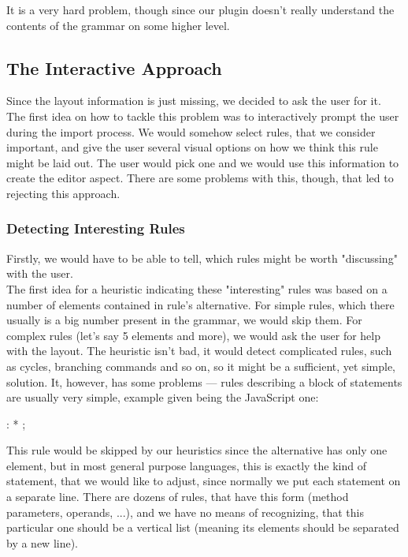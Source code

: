 It is a very hard problem, though since our plugin doesn't really understand the contents of the grammar on some higher level.

\subsection{The Interactive Approach}

Since the layout information is just missing, we decided to ask the user for it.
The first idea on how to tackle this problem was to interactively prompt the user during the import process.
We would somehow select rules, that we consider important, and give the user several visual options on how we think this rule might be laid out.
The user would pick one and we would use this information to create the editor aspect.
There are some problems with this, though, that led to rejecting this approach.

\subsubsection{Detecting Interesting Rules}

Firstly, we would have to be able to tell, which rules might be worth "discussing" with the user.
\\

The first idea for a heuristic indicating these "interesting" rules was based on a number of elements contained in rule's alternative.
For simple rules, which there usually is a big number present in the grammar, we would skip them.
For complex rules (let's say 5 elements and more), we would ask the user for help with the layout.
The heuristic isn't bad, it would detect complicated rules, such as cycles, branching commands and so on, so it might be a sufficient, yet simple, solution.
It, however, has some problems --- rules describing a block of statements are usually very simple, example given being the JavaScript one:

\begin{antlr}
	 : * ;
\end{antlr}

This rule would be skipped by our heuristics since the alternative has only one element, but in most general purpose languages, this is exactly the kind of statement, that we would like to adjust, since normally we put each statement on a separate line.
There are dozens of rules, that have this form (method parameters, operands, ...), and we have no means of recognizing, that this particular one should be a vertical list (meaning its elements should be separated by a new line).
\\

